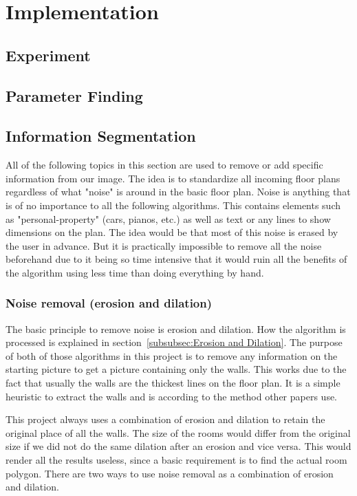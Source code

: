 \section{Implementation}

\subsection{Experiment}

\subsection{Parameter Finding}
\label{subsec:Parameter Finding}

\subsection{Information Segmentation}
All of the following topics in this section are used to remove or add specific information from our image. The idea is to standardize all incoming floor plans regardless of what "noise" is around in the basic floor plan. Noise is anything that is of no importance to all the following algorithms. This contains elements such as "personal-property" (cars, pianos, etc.) as well as text or any lines to show dimensions on the plan. The idea would be that most of this noise is erased by the user in advance. But it is practically impossible to remove all the noise beforehand due to it being so time intensive that it would ruin all the benefits of the algorithm using less time than doing everything by hand. 
\subsubsection{Noise removal (erosion and dilation)}
The basic principle to remove noise is erosion and dilation. How the algorithm is processed is explained in section~\ref{subsubsec:Erosion and Dilation}.
The purpose of both of those algorithms in this project is to remove any information on the starting picture to get a picture containing only the walls. This works due to the fact that usually the walls are the thickest lines on the floor plan. It is a simple heuristic to extract the walls and is according to the method other papers use. 

This project always uses a combination of erosion and dilation to retain the original place of all the walls. The size of the rooms would differ from the original size if we did not do the same dilation after an erosion and vice versa. This would render all the results useless, since a basic requirement is to find the actual room polygon. There are two ways to use noise removal as a combination of erosion and dilation. 

